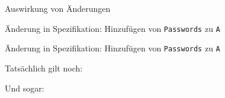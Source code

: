 \documentclass[18pt]{beamer}
\newcommand{\kit}[1]{\textcolor{kit-green100}{#1}}
\begin{document}
\begin{frame}[fragile]{Auswirkung von Änderungen}
\vfill

\begin{overprint}
\kit{Änderung in Spezifikation:} Hinzufügen von \texttt{Passwords} zu \texttt{A}
\begin{center}
\end{center}

\kit{Änderung in Spezifikation:} Hinzufügen von \texttt{Passwords} zu \texttt{A}
\begin{center}
\end{center}



\kit{Tatsächlich gilt noch:}
\begin{center}
\end{center}

\kit{Und sogar:}
\begin{center}
\end{center}

\end{overprint}

\end{frame}
\end{document}
